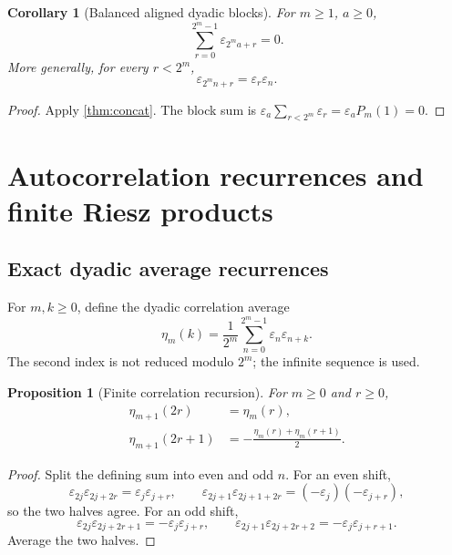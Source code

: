 \documentclass[11pt,oneside]{article}
\newtheorem{proposition}[theorem]{Proposition}
\newtheorem{corollary}[theorem]{Corollary}
\theoremstyle{definition}
\theoremstyle{remark}
\newcommand{\eps}{\varepsilon}
\newcommand{\1}{\mathbf 1}
\begin{document}
\begin{corollary}[Balanced aligned dyadic blocks]
\label{cor:dyadic-block-balance}
For \(m\ge1\), \(a\ge0\),
\begin{equation}
 \sum_{r=0}^{2^m-1}\eps_{2^ma+r}=0.
 \label{eq:dyadic-block-balance}
\end{equation}
More generally, for every \(r<2^m\),
\begin{equation}
 \eps_{2^mn+r}=\eps_r\eps_n.
 \label{eq:power-two-progressions}
\end{equation}
\end{corollary}

\begin{proof}
Apply \cref{thm:concat}.  The block sum is
\(\eps_a\sum_{r<2^m}\eps_r=\eps_aP_m(1)=0\).
\end{proof}

\section{Autocorrelation recurrences and finite Riesz products}
\label{sec:correlation}

\subsection{Exact dyadic average recurrences}

For \(m,k\ge0\), define the dyadic correlation average
\begin{equation}
 \eta_m(k)=\frac1{2^m}\sum_{n=0}^{2^m-1}\eps_n\eps_{n+k}.
 \label{eq:eta-m}
\end{equation}
The second index is not reduced modulo \(2^m\); the infinite sequence is used.

\begin{proposition}[Finite correlation recursion]
\label{prop:finite-correlation}
For \(m\ge0\) and \(r\ge0\),
\begin{align}
 \eta_{m+1}(2r)&=\eta_m(r),                                  \label{eq:eta-even}\\
 \eta_{m+1}(2r+1)&=-\frac{\eta_m(r)+\eta_m(r+1)}2.           \label{eq:eta-odd}
\end{align}
\end{proposition}

\begin{proof}
Split the defining sum into even and odd \(n\).  For an even shift,
\[
 \eps_{2j}\eps_{2j+2r}=\eps_j\eps_{j+r},
 \qquad
 \eps_{2j+1}\eps_{2j+1+2r}=(-\eps_j)(-\eps_{j+r}),
\]
so the two halves agree.  For an odd shift,
\[
 \eps_{2j}\eps_{2j+2r+1}=-\eps_j\eps_{j+r},
 \qquad
 \eps_{2j+1}\eps_{2j+2r+2}=-\eps_j\eps_{j+r+1}.
\]
Average the two halves.
\end{proof}
\end{document}

